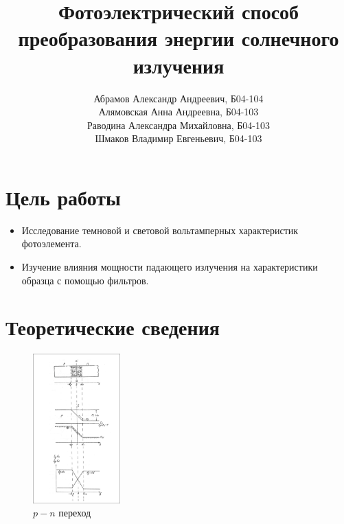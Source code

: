 \documentclass[a4paper, 12pt]{extarticle}
\title{\textcolor{main_title}{Фотоэлектрический способ преобразования энергии солнечного излучения}}
\author{%
    {Абрамов Александр Андреевич, Б04-104} \\
    {Алямовская Анна Андреевна, Б04-103}\\
    {Раводина Александра Михайловна, Б04-103} \\
    {Шмаков Владимир Евгеньевич, Б04-103}%
}
\begin{document}
\maketitle



\section*{\textcolor{header}{Цель работы}}

\begin{itemize}
    \item Исследование темновой и световой вольтамперных характеристик фотоэлемента.
    \item Изучение влияния мощности падающего излучения на характеристики образца с помощью фильтров.
\end{itemize}

\section*{\textcolor{header}{Теоретические сведения}}



\begin{figure}[htbp]
    \centering
    \includegraphics[width = 0.3\textwidth]{pics/diode.png}
    \caption{$p-n$ переход}
    \label{fig:diode}
\end{figure}
\end{document}
